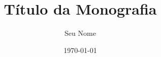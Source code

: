 \usepackage[utf8]{inputenc}
\usepackage[T1]{fontenc}
\usepackage{graphicx}
\usepackage{natbib}
\usepackage{hyperref}
\usepackage{amsmath, amssymb}
\usepackage{abntex2cite} %

\title{Título da Monografia}
\author{Seu Nome}
\date{\today}